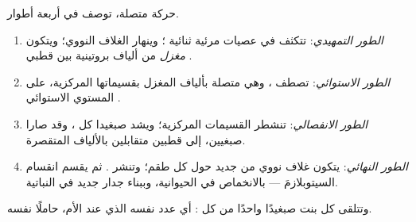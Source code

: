 \begin{proposition}\label{prop:g11:cell-cycle-mitosis:stages}
 حركة متصلة، توصف في أربعة أطوار.
\begin{enumerate}
  \item \emph{الطور التمهيدي}: تتكثف  في عصيات مرئية ثنائية
        ؛ وينهار الغلاف النووي؛ ويتكون \emph{مغزل} من ألياف
        بروتينية بين قطبي .
  \item \emph{الطور الاستوائي}: تصطف ، وهي متصلة بألياف
        المغزل بقسيماتها المركزية، على المستوي الاستوائي .
  \item \emph{الطور الانفصالي}: تنشطر القسيمات المركزية؛ ويشد صبغيدا
        كل ، وقد صارا صبغيين، إلى قطبين متقابلين بالألياف
        المتقصرة.
  \item \emph{الطور النهائي}: يتكون غلاف نووي من جديد حول كل طقم؛
        وتنشر . ثم يقسم انقسام  السيتوبلازمَ ---
        بالانخماص في  الحيوانية، وببناء جدار جديد في 
        النباتية.
\end{enumerate}
وتتلقى كل  بنت صبغيدًا واحدًا من كل : أي عدد  نفسه
الذي عند الأم، حاملًا  نفسه.
\end{proposition}
\admitted

